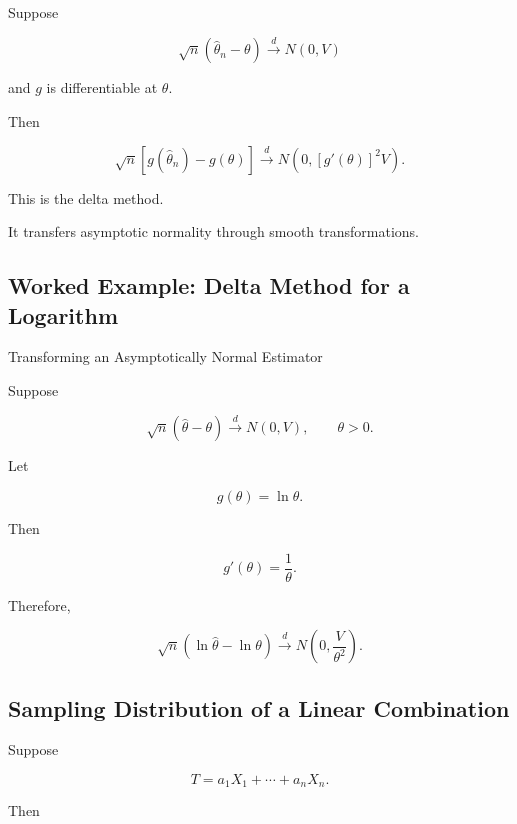 Suppose

\[
\sqrt{n}
(
\widehat{\theta}_n-\theta
)
\xrightarrow{d}
N(0,V)
\]

and \(g\) is differentiable at \(\theta\).

Then

\[
\boxed{
\sqrt{n}
\left[
g(\widehat{\theta}_n)
-
g(\theta)
\right]
\xrightarrow{d}
N
\left(
0,
[g'(\theta)]^2V
\right).
}
\]

This is the delta method.

It transfers asymptotic normality through smooth transformations.

\subsection{Worked Example: Delta Method for a Logarithm}
\label{subsec:worked-delta-log}

\begin{workedexamplebox}{Transforming an Asymptotically Normal Estimator}

Suppose

\[
\sqrt{n}
(
\widehat{\theta}-\theta
)
\xrightarrow{d}
N(0,V),
\qquad
\theta>0.
\]

Let

\[
g(\theta)=\ln\theta.
\]

Then

\[
g'(\theta)=\frac1\theta.
\]

Therefore,

\begin{answerbox}
\[
\boxed{
\sqrt{n}
\left(
\ln\widehat{\theta}
-
\ln\theta
\right)
\xrightarrow{d}
N
\left(
0,
\frac{V}{\theta^2}
\right).
}
\]
\end{answerbox}

\end{workedexamplebox}

\subsection{Sampling Distribution of a Linear Combination}
\label{subsec:sampling-linear-combination}

Suppose

\[
T
=
a_1X_1+\cdots+a_nX_n.
\]

Then


